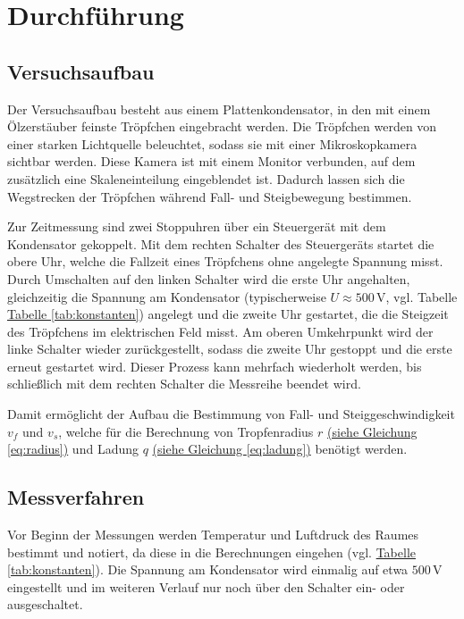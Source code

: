 \chapter{Durchführung}

\section{Versuchsaufbau}
Der Versuchsaufbau besteht aus einem Plattenkondensator, in den mit einem Ölzerstäuber feinste Tröpfchen eingebracht werden. Die Tröpfchen werden von einer starken Lichtquelle beleuchtet, sodass sie mit einer Mikroskopkamera sichtbar werden. Diese Kamera ist mit einem Monitor verbunden, auf dem zusätzlich eine Skaleneinteilung eingeblendet ist. Dadurch lassen sich die Wegstrecken der Tröpfchen während Fall- und Steigbewegung bestimmen. 

Zur Zeitmessung sind zwei Stoppuhren über ein Steuergerät mit dem Kondensator gekoppelt. Mit dem rechten Schalter des Steuergeräts startet die obere Uhr, welche die Fallzeit eines Tröpfchens ohne angelegte Spannung misst. Durch Umschalten auf den linken Schalter wird die erste Uhr angehalten, gleichzeitig die Spannung am Kondensator (typischerweise $U \approx 500\,\text{V}$, vgl. Tabelle \hyperref[tab:konstanten]{Tabelle \ref*{tab:konstanten}}) angelegt und die zweite Uhr gestartet, die die Steigzeit des Tröpfchens im elektrischen Feld misst. Am oberen Umkehrpunkt wird der linke Schalter wieder zurückgestellt, sodass die zweite Uhr gestoppt und die erste erneut gestartet wird. Dieser Prozess kann mehrfach wiederholt werden, bis schließlich mit dem rechten Schalter die Messreihe beendet wird.

Damit ermöglicht der Aufbau die Bestimmung von Fall- und Steiggeschwindigkeit $v_f$ und $v_s$, welche für die Berechnung von Tropfenradius $r$ \hyperref[eq:radius]{(siehe Gleichung \ref*{eq:radius})} und Ladung $q$ \hyperref[eq:ladung]{(siehe Gleichung \ref*{eq:ladung})} benötigt werden.

\section{Messverfahren}
Vor Beginn der Messungen werden Temperatur und Luftdruck des Raumes bestimmt und notiert, da diese in die Berechnungen eingehen (vgl. \hyperref[tab:konstanten]{Tabelle \ref*{tab:konstanten}}). Die Spannung am Kondensator wird einmalig auf etwa $500\,\text{V}$ eingestellt und im weiteren Verlauf nur noch über den Schalter ein- oder ausgeschaltet. 


